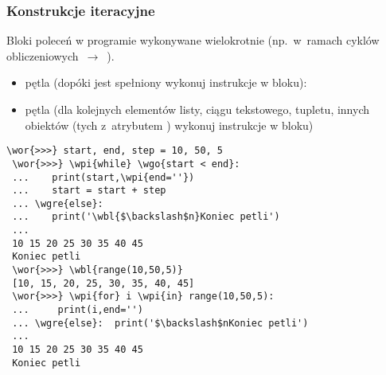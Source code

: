 \begin{frame}[fragile]
\frametitle{Konstrukcje iteracyjne}

\begin{minipage}[t]{.45\textwidth}\vspace{0pt}
\small\raggedright
 Bloki poleceń w programie wykonywane wielokrotnie (np.~w~ramach
 cyklów obliczeniowych~$\rightarrow$~).\\[1ex]

\begin{itemize}
 \item  pętla  (dopóki  jest
 spełniony wykonuj instrukcje w bloku):

 \item pętla  (dla kolejnych elementów listy,
 ciągu tekstowego, tupletu, innych obiektów (tych z~atrybutem
 ) wykonuj instrukcje w bloku)
\end{itemize}
\end{minipage}\hspace{.02\textwidth}%
\begin{minipage}[t]{.52\textwidth}\vspace{0pt}

 \begin{Verbatim}[fontsize=\scriptsize,codes={\catcode`$=3\catcode`^=7},
                 frame=single,framesep=3mm,commandchars=\\\{\},gobble=1]
 \wor{>>>} start, end, step = 10, 50, 5
 \wor{>>>} \wpi{while} \wgo{start < end}:
 ...    print(start,\wpi{end=''})
 ...    start = start + step
 ... \wgre{else}:
 ...    print('\wbl{$\backslash$n}Koniec petli')
 ...
 10 15 20 25 30 35 40 45 
 Koniec petli
 \wor{>>>} \wbl{range(10,50,5)}
 [10, 15, 20, 25, 30, 35, 40, 45]
 \wor{>>>} \wpi{for} i \wpi{in} range(10,50,5):
 ...     print(i,end='')
 ... \wgre{else}:  print('$\backslash$nKoniec petli')
 ...
 10 15 20 25 30 35 40 45 
 Koniec petli
 \end{Verbatim}
\end{minipage}
\end{frame}


